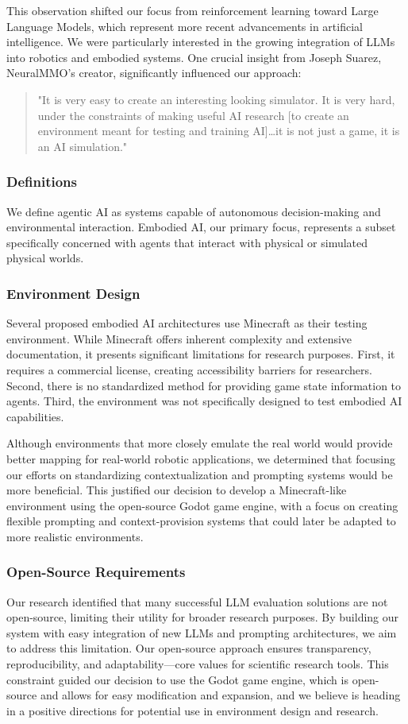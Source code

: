 \documentclass{article}
\begin{document}
This observation shifted our focus from reinforcement learning toward Large Language Models, which represent more recent advancements in artificial intelligence.
We were particularly interested in the growing integration of LLMs into robotics and embodied systems.
One crucial insight from Joseph Suarez, NeuralMMO's creator, significantly influenced our approach:
\begin{quote}
    "It is very easy to create an interesting looking simulator. It is very hard, under the constraints of making useful AI research [to create an environment meant for testing and training AI]…it is not just a game, it is an AI simulation."
\end{quote}

\subsubsection{Definitions}
We define agentic AI as systems capable of autonomous decision-making and environmental interaction.
Embodied AI, our primary focus, represents a subset specifically concerned with agents that interact with physical or simulated physical worlds.

\subsubsection{Environment Design}
Several proposed embodied AI architectures use Minecraft as their testing environment.
While Minecraft offers inherent complexity and extensive documentation, it presents significant limitations for research purposes.
First, it requires a commercial license, creating accessibility barriers for researchers.
Second, there is no standardized method for providing game state information to agents.
Third, the environment was not specifically designed to test embodied AI capabilities.

Although environments that more closely emulate the real world would provide better mapping for real-world robotic applications, we determined that focusing our efforts on standardizing contextualization and prompting systems would be more beneficial.
This justified our decision to develop a Minecraft-like environment using the open-source Godot game engine, with a focus on creating flexible prompting and context-provision systems that could later be adapted to more realistic environments.

\subsubsection{Open-Source Requirements}
Our research identified that many successful LLM evaluation solutions are not open-source, limiting their utility for broader research purposes.
By building our system with easy integration of new LLMs and prompting architectures, we aim to address this limitation.
Our open-source approach ensures transparency, reproducibility, and adaptability—core values for scientific research tools.
This constraint guided our decision to use the Godot game engine, which is open-source and allows for easy modification and expansion, and we believe is heading in a positive directions for potential use in environment design and research.
\end{document}
